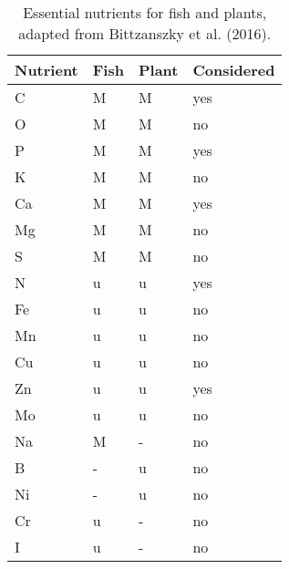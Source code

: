 \begin{table}
\centering
  \caption{Essential nutrients for fish and plants, adapted from Bittzanszky et al. (2016).}
  \label{tab:essentials}
  \begin{tabularx}{\textwidth}{XXXX}

\toprule

Nutrient & Fish & Plant & Considered \\

\midrule
C & M & M & yes\\
O & M & M & no\\
P & M & M & yes\\
K & M & M & no\\
Ca & M & M & yes\\
Mg & M & M & no\\
S & M & M & no\\

N & u & u & yes\\
Fe & u & u & no\\
Mn & u & u & no\\
Cu & u & u & no\\
Zn & u & u & yes\\
Mo & u & u & no\\

\hline

Na & M & - & no\\
B & - & u & no\\
Ni & - & u & no\\
Cr & u & - & no\\
I & u & - & no\\


\bottomrule

  \end{tabularx}
\end{table}